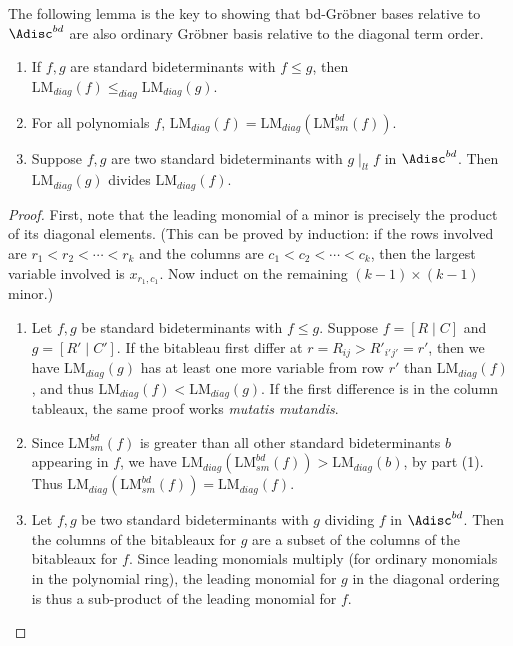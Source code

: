 \documentclass[11pt,reqno]{amsart}
\newcommand{\bitab}[2]{[#1\;|\;#2]}
\newcommand{\ltdivides}{\mid_{lt}}
\newcommand{\lm}{\text{LM}}
\newcommand{\lmsm}{\text{LM}_{sm}}
\theoremstyle{definition}
\numberwithin{equation}{section}
\begin{document}
The following lemma is the key to showing that bd-Gröbner bases relative to $\Adisc^{bd}$ are also ordinary Gröbner basis relative to the diagonal term order.

\begin{lemma} \label{lem:ordinary}
\begin{enumerate}
\item If $f,g$ are standard bideterminants with $f \leq g$, then $\lm_{diag}(f) \leq_{diag} \lm_{diag}(g)$.

\item For all polynomials $f$, $\lm_{diag}(f) = \lm_{diag}(\lmsm^{bd}(f))$.

\item \label{lem:ordinary:div} Suppose $f,g$ are two standard bideterminants with $g \ltdivides f$ in $\Adisc^{bd}$. Then $\lm_{diag}(g)$ divides $\lm_{diag}(f)$.
\end{enumerate}
\end{lemma}

\begin{proof}
First, note that the leading monomial of a minor is precisely the product of its diagonal elements. (This can be proved by induction: if the rows involved are $r_1 < r_2 < \dotsb < r_k$ and the columns are $c_1 < c_2 < \dotsb < c_k$, then the largest variable involved is $x_{r_1,c_1}$. Now induct on the remaining $(k-1) \times (k-1)$ minor.)

\begin{enumerate}
\item Let $f,g$ be standard bideterminants with $f \leq g$. Suppose $f = \bitab{R}{C}$ and $g = \bitab{R'}{C'}$. If the bitableau first differ at $r = R_{ij} > R'_{i'j'} = r'$, then we have $\lm_{diag}(g)$ has at least one more variable from row $r'$ than $\lm_{diag}(f)$, and thus $\lm_{diag}(f) < \lm_{diag}(g)$. If the first difference is in the column tableaux, the same proof works \emph{mutatis mutandis}.

\item Since $\lmsm^{bd}(f)$ is greater than all other standard bideterminants $b$ appearing in $f$, we have $\lm_{diag}(\lmsm^{bd}(f)) > \lm_{diag}(b)$, by part (1). Thus $\lm_{diag}(\lmsm^{bd}(f)) = \lm_{diag}(f)$.

\item Let $f,g$ be two standard bideterminants with $g$ dividing $f$ in $\Adisc^{bd}$. Then the columns of the bitableaux for $g$ are a subset of the columns of the bitableaux for $f$. Since leading monomials multiply (for ordinary monomials in the polynomial ring), the leading monomial for $g$ in the diagonal ordering is thus a sub-product of the leading monomial for $f$. \qedhere
\end{enumerate}
\end{proof}
\end{document}
